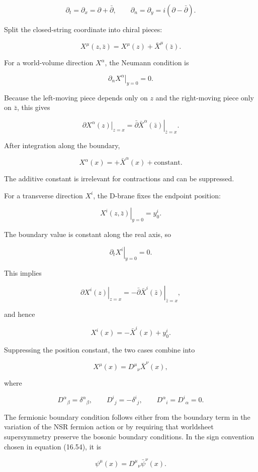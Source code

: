 \documentclass[
  10pt,
  a4paper,
  openany]{book}
\begin{document}
\[
\partial_t=\partial_x=\partial+\bar\partial,
\qquad
\partial_n=\partial_y=i(\partial-\bar\partial).
\]

Split the closed-string coordinate into chiral pieces:

\[
X^\mu(z,\bar z)
=X^\mu(z)+\bar X^\mu(\bar z).
\]

For a world-volume direction \(X^\alpha\), the Neumann condition is

\[
\left.\partial_nX^\alpha\right|_{y=0}=0.
\]

Because the left-moving piece depends only on \(z\) and the right-moving
piece only on \(\bar z\), this gives

\[
\left.\partial X^\alpha(z)\right|_{z=x}
=
\left.\bar\partial\bar X^\alpha(\bar z)\right|_{\bar z=x}.
\]

After integration along the boundary,

\[
X^\alpha(x)=+\bar X^\alpha(x)+\text{constant}.
\]

The additive constant is irrelevant for contractions and can be
suppressed.

For a transverse direction \(X^i\), the D-brane fixes the endpoint
position:

\[
\left.X^i(z,\bar z)\right|_{y=0}=y_0^i.
\]

The boundary value is constant along the real axis, so

\[
\left.\partial_tX^i\right|_{y=0}=0.
\]

This implies

\[
\left.\partial X^i(z)\right|_{z=x}
=-\left.\bar\partial\bar X^i(\bar z)\right|_{\bar z=x},
\]

and hence

\[
X^i(x)=-\bar X^i(x)+y_0^i.
\]

Suppressing the position constant, the two cases combine into

\[
\boxed{
X^\mu(x)=D^\mu{}_\nu\bar X^\nu(x),
}
\]

where

\[
D^\alpha{}_\beta=\delta^\alpha{}_\beta,
\qquad
D^i{}_j=-\delta^i{}_j,
\qquad
D^\alpha{}_i=D^i{}_\alpha=0.
\]

The fermionic boundary condition follows either from the boundary term
in the variation of the NSR fermion action or by requiring that
worldsheet supersymmetry preserve the bosonic boundary conditions. In
the sign convention chosen in equation (16.54), it is

\[
\boxed{
\psi^\mu(x)=D^\mu{}_\nu\bar\psi^\nu(x).
}
\]
\end{document}
